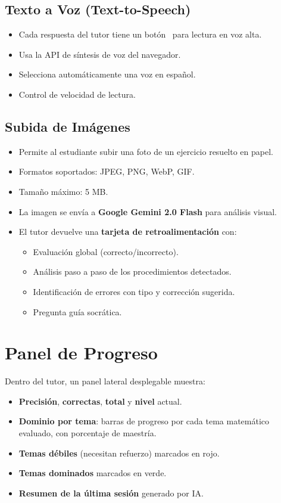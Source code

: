 \documentclass[12pt, a4paper, oneside]{book}
\begin{document}
\subsection{Texto a Voz (Text-to-Speech)}

\begin{itemize}
    \item Cada respuesta del tutor tiene un botón \faVolumeUp\ para lectura en voz alta.
    \item Usa la API de síntesis de voz del navegador.
    \item Selecciona automáticamente una voz en español.
    \item Control de velocidad de lectura.
\end{itemize}

\subsection{Subida de Imágenes}

\begin{itemize}
    \item Permite al estudiante subir una foto de un ejercicio resuelto en papel.
    \item Formatos soportados: JPEG, PNG, WebP, GIF.
    \item Tamaño máximo: 5 MB.
    \item La imagen se envía a \textbf{Google Gemini 2.0 Flash} para análisis visual.
    \item El tutor devuelve una \textbf{tarjeta de retroalimentación} con:
    \begin{itemize}
        \item Evaluación global (correcto/incorrecto).
        \item Análisis paso a paso de los procedimientos detectados.
        \item Identificación de errores con tipo y corrección sugerida.
        \item Pregunta guía socrática.
    \end{itemize}
\end{itemize}

\section{Panel de Progreso}

Dentro del tutor, un panel lateral desplegable muestra:
\begin{itemize}
    \item \textbf{Precisión}, \textbf{correctas}, \textbf{total} y \textbf{nivel} actual.
    \item \textbf{Dominio por tema}: barras de progreso por cada tema matemático evaluado, con porcentaje de maestría.
    \item \textbf{Temas débiles} (necesitan refuerzo) marcados en rojo.
    \item \textbf{Temas dominados} marcados en verde.
    \item \textbf{Resumen de la última sesión} generado por IA.
\end{itemize}
\end{document}
